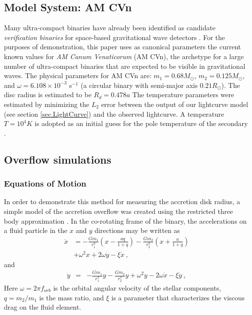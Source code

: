\documentclass[preprint2]{aastex}
\newcommand{\note}[1]{[$\blacktriangleright$~\textbf{#1}~$\blacktriangleleft$]}
\begin{document}
\subsection{Model System: AM CVn} \label{sec.modelParameters}
Many ultra-compact binaries have already been identified as candidate
\textit{verification binaries} for space-based gravitational wave
detectors \citep{NelemansWiki}.  For the purposes of demonstration,
this paper uses as canonical parameters the current known values for
\textit{AM Canum Venaticorum} (AM CVn), the archetype for a large
number of ultra-compact binaries that are expected to be
visible in gravitational waves.  The physical parameters for AM CVn
are: $m_{1} = 0.68M_{\odot}$, $m_{2} = 0.125M_{\odot}$, and $\omega =
6.108 \times 10^{-3}$ s$^{-1}$ (a circular binary with semi-major axis
$0.21 R_{\odot}$). The disc radius is estimated to be $R_d
= 0.478a$ \citep{1998A&A...332..939S}    
The temperature parameters were estimated by minimizing the $L_2$ error between the output of our lightcurve model (see section \ref{sec.LightCurve}) and the observed lightcurve. A temperature $T=10^{4}K$ is adopted as an initial guess for the pole
temperature of the secondary \citep{2006MNRAS.371.1231R}. 



\subsection{Overflow simulations}\label{sec.Overflow}
\subsubsection{Equations of Motion}
In order to demonstrate this method for measuring the
accretion disk radius, a simple model of the accretion overflow was
created using the restricted three body approximation
\citep{Flannery1975}.  In the co-rotating frame of the binary, the
accelerations on a fluid particle in the $x$ and $y$ directions may be
written as
\begin{align}
	{\ddot x} & = -\frac{G m_{1}}{r_{1}^{3}}\left(x
	- \frac{aq}{1 + q}\right) - \frac{G
	m_{2}}{r_{2}^{3}}\left(x +
	\frac{a}{1 + q}\right) \nonumber \\
	& + \omega^{2}x + 2 \omega{\dot y} - \xi {\dot x}\ ,
	\label{eqn.xDDot}
\end{align}
and
\begin{align}
	{\ddot y} & = & -\frac{G m_{1}}{r_{1}^{3}}y - \frac{Gm_{2}}{r_{2}^{3}}y + \omega^{2}y - 2\omega{\dot x} - \xi {\dot y}\ , 
	\label{eqn.yDDot}
\end{align}
Here $\omega = 2\pi f_{orb}$ is the orbital angular velocity of the
stellar components, $q = m_2/m_1$ is the mass ratio, and $\xi$ is a
parameter that characterizes the viscous drag on the fluid element.
\end{document}
